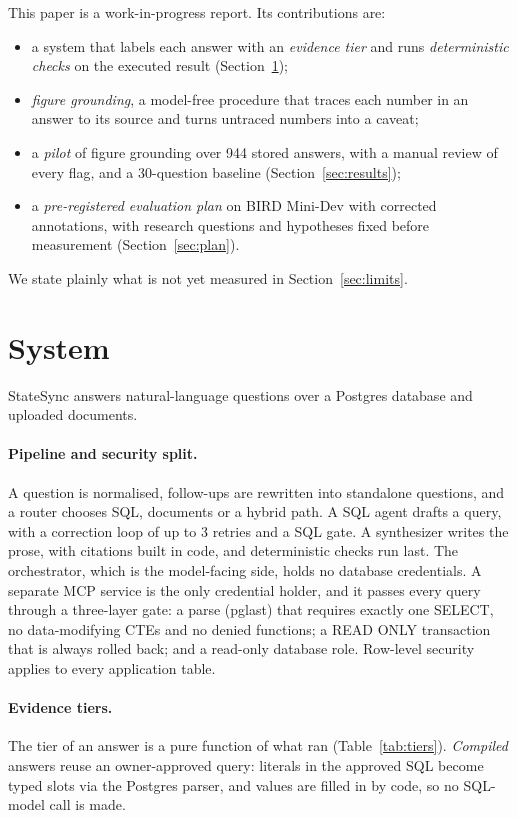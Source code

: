 \documentclass[10pt,twocolumn]{article}
\begin{document}
This paper is a work-in-progress report. Its contributions are:
\begin{itemize}
\item a system that labels each answer with an \emph{evidence tier} and runs \emph{deterministic checks} on the executed result (Section~\ref{sec:system});
\item \emph{figure grounding}, a model-free procedure that traces each number in an answer to its source and turns untraced numbers into a caveat;
\item a \emph{pilot} of figure grounding over 944 stored answers, with a manual review of every flag, and a 30-question baseline (Section~\ref{sec:results});
\item a \emph{pre-registered evaluation plan} on BIRD Mini-Dev with corrected annotations, with research questions and hypotheses fixed before measurement (Section~\ref{sec:plan}).
\end{itemize}
We state plainly what is not yet measured in Section~\ref{sec:limits}.

\section{System}\label{sec:system}
StateSync answers natural-language questions over a Postgres database and uploaded documents.

\paragraph{Pipeline and security split.} A question is normalised, follow-ups are rewritten into standalone questions, and a router chooses SQL, documents or a hybrid path. A SQL agent drafts a query, with a correction loop of up to 3 retries and a SQL gate. A synthesizer writes the prose, with citations built in code, and deterministic checks run last. The orchestrator, which is the model-facing side, holds no database credentials. A separate MCP service is the only credential holder, and it passes every query through a three-layer gate: a parse (pglast) that requires exactly one SELECT, no data-modifying CTEs and no denied functions; a READ ONLY transaction that is always rolled back; and a read-only database role. Row-level security applies to every application table.

\paragraph{Evidence tiers.} The tier of an answer is a pure function of what ran (Table~\ref{tab:tiers}). \emph{Compiled} answers reuse an owner-approved query: literals in the approved SQL become typed slots via the Postgres parser, and values are filled in by code, so no SQL-model call is made.
\end{document}
